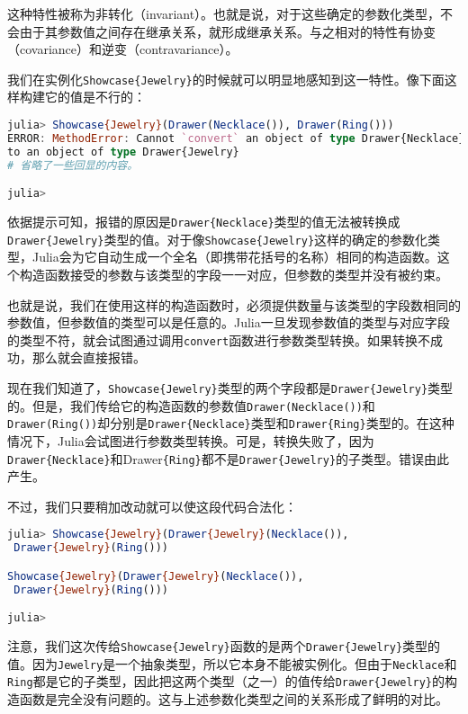 这种特性被称为非转化（invariant）。也就是说，对于这些确定的参数化类型，不会由于其参数值之间存在继承关系，就形成继承关系。与之相对的特性有协变（covariance）和逆变（contravariance）。

我们在实例化\verb`Showcase{Jewelry}`的时候就可以明显地感知到这一特性。像下面这样构建它的值是不行的：
\begin{lstlisting}[language=julia]
julia> Showcase{Jewelry}(Drawer(Necklace()), Drawer(Ring()))
ERROR: MethodError: Cannot `convert` an object of type Drawer{Necklace} 
to an object of type Drawer{Jewelry}
# 省略了一些回显的内容。

julia> 
\end{lstlisting}

依据提示可知，报错的原因是\verb`Drawer{Necklace}`类型的值无法被转换成\verb`Drawer{Jewelry}`类型的值。对于像\verb`Showcase{Jewelry}`这样的确定的参数化类型，Julia会为它自动生成一个全名（即携带花括号的名称）相同的构造函数。这个构造函数接受的参数与该类型的字段一一对应，但参数的类型并没有被约束。

也就是说，我们在使用这样的构造函数时，必须提供数量与该类型的字段数相同的参数值，但参数值的类型可以是任意的。Julia一旦发现参数值的类型与对应字段的类型不符，就会试图通过调用\verb`convert`函数进行参数类型转换。如果转换不成功，那么就会直接报错。

现在我们知道了，\verb`Showcase{Jewelry}`类型的两个字段都是\verb`Drawer{Jewelry}`类型的。但是，我们传给它的构造函数的参数值\verb`Drawer(Necklace())`和\verb`Drawer(Ring())`却分别是\verb`Drawer{Necklace}`类型和\verb`Drawer{Ring}`类型的。在这种情况下，Julia会试图进行参数类型转换。可是，转换失败了，因为\verb`Drawer{Necklace}`和Drawer\verb`{Ring}`都不是\verb`Drawer{Jewelry}`的子类型。错误由此产生。

不过，我们只要稍加改动就可以使这段代码合法化：
\begin{lstlisting}[language=julia]
julia> Showcase{Jewelry}(Drawer{Jewelry}(Necklace()),
 Drawer{Jewelry}(Ring()))

Showcase{Jewelry}(Drawer{Jewelry}(Necklace()),
 Drawer{Jewelry}(Ring()))

julia> 
\end{lstlisting}

注意，我们这次传给\verb`Showcase{Jewelry}`函数的是两个\verb`Drawer{Jewelry}`类型的值。因为\verb`Jewelry`是一个抽象类型，所以它本身不能被实例化。但由于\verb`Necklace`和\verb`Ring`都是它的子类型，因此把这两个类型（之一）的值传给\verb`Drawer{Jewelry}`的构造函数是完全没有问题的。这与上述参数化类型之间的关系形成了鲜明的对比。


